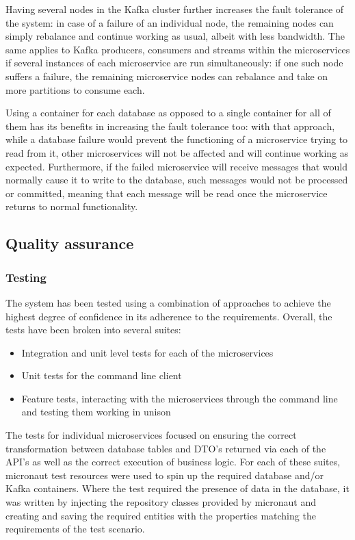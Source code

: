 \documentclass[parskip=full]{article}
\begin{document}
Having several nodes in the Kafka cluster further increases the fault tolerance of the system: in case of a failure of an individual node, the remaining nodes can simply rebalance and continue working as usual, albeit with less bandwidth.
The same applies to Kafka producers, consumers and streams within the microservices if several instances of each microservice are run simultaneously: if one such node suffers a failure, the remaining microservice nodes can rebalance and take on more partitions to consume each.

Using a container for each database as opposed to a single container for all of them has its benefits in increasing the fault tolerance too: with that approach, while a database failure would prevent the functioning of a microservice trying to read from it, other microservices will not be affected and will continue working as expected.
Furthermore, if the failed microservice will receive messages that would normally cause it to write to the database, such messages would not be processed or committed, meaning that each message will be read once the microservice returns to normal functionality.

    \pagebreak
    \subsection{Quality assurance}
    \subsubsection{Testing}
    The system has been tested using a combination of approaches to achieve the highest degree of confidence in its adherence to the requirements.
    Overall, the tests have been broken into several suites:
    \begin{itemize}
        \item Integration and unit level tests for each of the microservices
        \item Unit tests for the command line client
        \item Feature tests, interacting with the microservices through the command line and testing them working in unison
    \end{itemize}
The tests for individual microservices focused on ensuring the correct transformation between database tables and DTO's returned via each of the API's as well as the correct execution of business logic.
For each of these suites, micronaut test resources were used to spin up the required database and/or Kafka containers.
Where the test required the presence of data in the database, it  was written by injecting the repository classes provided by micronaut and creating and saving the required entities with the properties matching the requirements of the test scenario.
\end{document}
